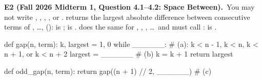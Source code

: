 \documentclass[10pt]{scrartcl}
\begin{document}
\begin{prob}\textbf{E2 (Fall 2026 Midterm 1, Question 4.1--4.2: Space Between).}\ You may not write , , \cd{[}, \cd{]},  or .  returns the largest absolute difference between consecutive terms of , \dots,  ():  is ;  is .  does the same for , , , \dots\ and must call :  is .
\begin{py}
def gap(n, term):
    k, largest = 1, 0
    while ______:           # (a): k < n - 1,  k < n,  k < n + 1,  or  k < n + 2
        largest = ______    # (b)
        k = k + 1
    return largest

def odd_gap(n, term):
    return gap((n + 1) // 2, ______)    # (c)
\end{py}
\end{prob}
\end{document}
